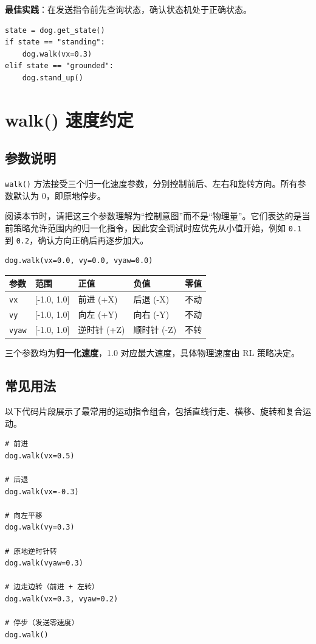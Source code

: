 \documentclass[a4paper,11pt,openany]{book}
\begin{document}
\noindent\textbf{最佳实践}：在发送指令前先查询状态，确认状态机处于正确状态。

\begin{lstlisting}[style=python]
state = dog.get_state()
if state == "standing":
    dog.walk(vx=0.3)
elif state == "grounded":
    dog.stand_up()
\end{lstlisting}

\section{walk() 速度约定}

\subsection{参数说明}

\texttt{walk()} 方法接受三个归一化速度参数，分别控制前后、左右和旋转方向。所有参数默认为 0，即原地停步。

阅读本节时，请把这三个参数理解为“控制意图”而不是“物理量”。它们表达的是当前策略允许范围内的归一化指令，因此安全调试时应优先从小值开始，例如 \texttt{0.1} 到 \texttt{0.2}，确认方向正确后再逐步加大。

\begin{lstlisting}[style=python]
dog.walk(vx=0.0, vy=0.0, vyaw=0.0)
\end{lstlisting}

\begin{longtable}{lllll}
\toprule
参数 & 范围 & 正值 & 负值 & 零值 \\
\midrule
\endhead
\texttt{vx} & {[}-1.0, 1.0{]} & 前进 (+X) & 后退 (-X) & 不动 \\
\texttt{vy} & {[}-1.0, 1.0{]} & 向左 (+Y) & 向右 (-Y) & 不动 \\
\texttt{vyaw} & {[}-1.0, 1.0{]} & 逆时针 (+Z) & 顺时针 (-Z) & 不转 \\
\bottomrule
\end{longtable}

三个参数均为\textbf{归一化速度}，1.0 对应最大速度，具体物理速度由 RL 策略决定。

\subsection{常见用法}

以下代码片段展示了最常用的运动指令组合，包括直线行走、横移、旋转和复合运动。

\begin{lstlisting}[style=python]
# 前进
dog.walk(vx=0.5)

# 后退
dog.walk(vx=-0.3)

# 向左平移
dog.walk(vy=0.3)

# 原地逆时针转
dog.walk(vyaw=0.3)

# 边走边转（前进 + 左转）
dog.walk(vx=0.3, vyaw=0.2)

# 停步（发送零速度）
dog.walk()
\end{lstlisting}
\end{document}
